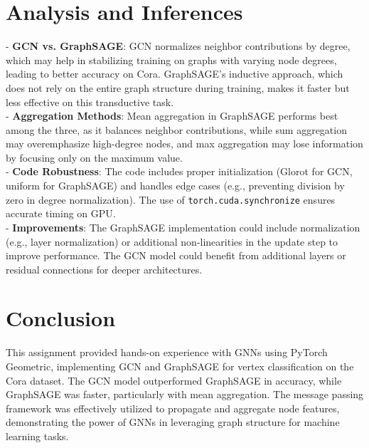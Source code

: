 \documentclass{article}
\begin{document}
\section*{Analysis and Inferences}
- \textbf{GCN vs. GraphSAGE}: GCN normalizes neighbor contributions by degree, which may help in stabilizing training on graphs with varying node degrees, leading to better accuracy on Cora. GraphSAGE’s inductive approach, which does not rely on the entire graph structure during training, makes it faster but less effective on this transductive task.\\
- \textbf{Aggregation Methods}: Mean aggregation in GraphSAGE performs best among the three, as it balances neighbor contributions, while sum aggregation may overemphasize high-degree nodes, and max aggregation may lose information by focusing only on the maximum value.\\
- \textbf{Code Robustness}: The code includes proper initialization (Glorot for GCN, uniform for GraphSAGE) and handles edge cases (e.g., preventing division by zero in degree normalization). The use of \texttt{torch.cuda.synchronize} ensures accurate timing on GPU.\\
- \textbf{Improvements}: The GraphSAGE implementation could include normalization (e.g., layer normalization) or additional non-linearities in the update step to improve performance. The GCN model could benefit from additional layers or residual connections for deeper architectures.

\section*{Conclusion}
This assignment provided hands-on experience with GNNs using PyTorch Geometric, implementing GCN and GraphSAGE for vertex classification on the Cora dataset. The GCN model outperformed GraphSAGE in accuracy, while GraphSAGE was faster, particularly with mean aggregation. The message passing framework was effectively utilized to propagate and aggregate node features, demonstrating the power of GNNs in leveraging graph structure for machine learning tasks.
\end{document}
